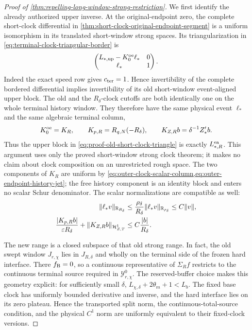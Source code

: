 \begin{proof}[Proof of
\cref{thm:repelling-long-window-strong-restriction}]
We first identify the already authorized upper inverse.  At the
original-endpoint zero, the complete short-clock differential in
\cref{thm:short-clock-original-endpoint-segment} is a uniform isomorphism
in its translated short-window strong spaces.  Its triangularization in
\cref{eq:terminal-clock-triangular-border} is
\begin{equation}
 \begin{pmatrix}
  L_{*,\rm up}-K_0^{\rm oe}\ell_*&0\\
  \ell_*&1
 \end{pmatrix}.                                      \label{eq:proof-old-short-clock-triangle}
\end{equation}
Indeed the exact speed row gives \(c_{\rm ter}=1\).  Hence invertibility of
the complete bordered differential implies invertibility of its old
short-window event-aligned upper block.  The old and the
\(R_\delta\)-clock cutoffs are both identically one on the whole terminal
history window.  They therefore have the same physical event \(\ell_*\)
and the same algebraic terminal column,
\begin{equation}
 K_0^{\rm oe}=K_R,
 \qquad K_{p,R}=R_{q,N}(-R_\delta),\qquad
 K_{Z,R}b=\delta^{-1}Z_*'b.                    \label{eq:proof-clock-columns-agree}
\end{equation}
Thus the upper block in \cref{eq:proof-old-short-clock-triangle} is exactly
\(L_{*,R}^{\rm ea}\).  This argument uses only the proved short-window
strong clock theorem; it makes no claim about clock composition on an
unrestricted rough space.  The two components of \(K_R\) are uniform by
\cref{eq:outer-clock-scalar-column,eq:outer-endpoint-history-jet}; the free
history component is an identity block and enters no scalar Schur
denominator.
The scalar normalizations are compatible as well:
\begin{align}
 \|\ell_*v\|_{\mathbb R_{R_\delta}}
 &\le \frac{\rho_\delta}{R_\delta}
       \|\ell_*v\|_{\mathbb R_{\rho_\delta}}
 \le C\|v\|,\notag\\
 \frac{|K_{p,R}b|}{\varepsilon R_\delta}
  +\|K_{Z,R}b\|_{\mathcal H_{Z,T}^1}
 &\le C\frac{|b|}{R_\delta}.                    \label{eq:proof-long-clock-scalar-ledger}
\end{align}

The new range is a closed subspace of that old strong range.  In fact, the
old swept window \(J_{r,\chi}\) lies in \(J_{R,\delta}\) and wholly on the
terminal side of the frozen hard interface.  There \(f_{\rm B}=0\), so a
continuous representative of \(\Sigma_Rf\) restricts to the continuous
terminal source required in \(\mathcal Y_{r,\chi}^0\).  The reserved-buffer
choice makes this geometry explicit: for sufficiently small \(\delta\),
\(L_{\chi,\delta}+2\theta_m+1<L_b\).  The fixed base clock has uniformly
bounded derivative and inverse, and the hard interface
lies on its zero plateau.  Hence the transported split norm, the
continuous-total-source condition, and the physical \(C^1\) norm are
uniformly equivalent to their fixed-clock versions.


\end{proof}
